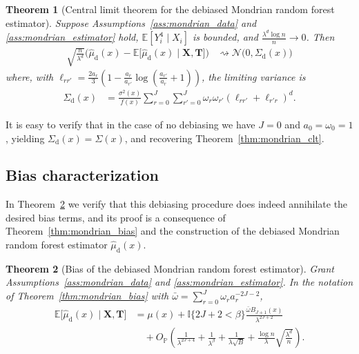 \documentclass[11pt,lof]{puthesis}
\renewcommand{\P}{\ensuremath{\mathbb{P}}}
\newcommand{\E}{\ensuremath{\mathbb{E}}}
\newcommand{\I}{\ensuremath{\mathbb{I}}}
\newcommand{\rd}{\ensuremath{\mathrm{d}}}
\newcommand{\bX}{\ensuremath{\mathbf{X}}}
\newcommand{\bT}{\ensuremath{\mathbf{T}}}
\newcommand{\cN}{\ensuremath{\mathcal{N}}}
\theoremstyle{break}
\newtheorem{theorem}{Theorem}[section]
\theoremstyle{proof}
\begin{document}
\begin{theorem}[Central limit theorem for the
debiased Mondrian random forest estimator]%
\label{thm:mondrian_clt_debiased}
%
Suppose Assumptions~\ref{ass:mondrian_data} and \ref{ass:mondrian_estimator}
hold,
$\E[Y_i^4 \mid X_i ]$ is bounded,
and $\frac{\lambda^d \log n}{n} \to 0$. Then
%
\begin{align*}
\sqrt{\frac{n}{\lambda^d}}
\Big(
\hat \mu_\rd(x)
- \E \big[ \hat \mu_\rd(x) \mid \bX, \bT \big]
\Big)
&\rightsquigarrow
\cN\big(0, \Sigma_\rd(x)\big)
\end{align*}
%
where, with $\ell_{r r'} = \frac{2 a_r}{3} \left( 1 - \frac{a_{r}}{a_{r'}}
\log\left(\frac{a_{r'}}{a_{r}} + 1\right) \right)$,
the limiting variance is
%
\begin{align*}
\Sigma_\rd(x)
&=
\frac{\sigma^2(x)}{f(x)}
\sum_{r=0}^{J} \sum_{r'=0}^{J} \omega_r \omega_{r'}
\left( \ell_{r r'} + \ell_{r' r} \right)^d.
\end{align*}
%
\end{theorem}

It is easy to verify that in the case of no debiasing we have
$J=0$ and $a_0 = \omega_0 = 1$, yielding
$\Sigma_\rd(x) = \Sigma(x)$, and recovering Theorem~\ref{thm:mondrian_clt}.

\subsection*{Bias characterization}

In Theorem~\ref{thm:mondrian_bias_debiased} we verify that this debiasing
procedure does indeed annihilate the desired bias terms, and its proof is a
consequence of Theorem~\ref{thm:mondrian_bias} and the construction of the
debiased Mondrian random forest estimator $\hat\mu_\rd(x)$.

\begin{theorem}[Bias of the debiased Mondrian random forest estimator]%
\label{thm:mondrian_bias_debiased}
Grant Assumptions~\ref{ass:mondrian_data} and \ref{ass:mondrian_estimator}.
In the notation of Theorem~\ref{thm:mondrian_bias} with
$\bar\omega = \sum_{r=0}^J \omega_r a_r^{-2J - 2}$,
%
\begin{align*}
\E \big[ \hat \mu_\rd(x) \mid \bX, \bT \big]
&= \mu(x) + \I\{2J+2 < \beta \}
\frac{\bar\omega B_{J+1}(x)}{\lambda^{2J + 2}} \\
&\quad+
O_\P \left(
\frac{1}{\lambda^{2J + 4}}
+ \frac{1}{\lambda^\beta}
+ \frac{1}{\lambda \sqrt B}
+ \frac{\log n}{\lambda} \sqrt{\frac{\lambda^d}{n}}
\right).
\end{align*}
%
\end{theorem}
\end{document}
